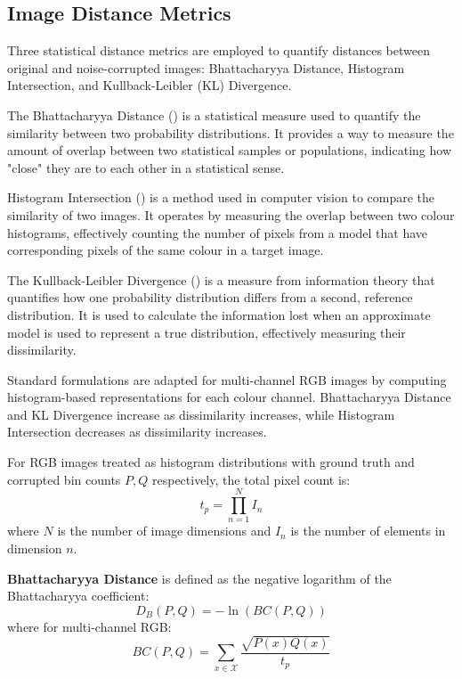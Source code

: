 
\subsection{Image Distance Metrics}
\label{methods:distance_metrics}

Three statistical distance metrics are employed to quantify distances between original and noise-corrupted images: Bhattacharyya Distance, Histogram Intersection, and Kullback-Leibler (KL) Divergence. 

The Bhattacharyya Distance (\cite{bhattacharyya1943}) is a statistical measure used to quantify the similarity between two probability distributions. It provides a way to measure the amount of overlap between two statistical samples or populations, indicating how "close" they are to each other in a statistical sense.

Histogram Intersection (\cite{swain1991}) is a method used in computer vision to compare the similarity of two images. It operates by measuring the overlap between two colour histograms, effectively counting the number of pixels from a model that have corresponding pixels of the same colour in a target image. 

The Kullback-Leibler Divergence (\cite{kullback1951}) is a measure from information theory that quantifies how one probability distribution differs from a second, reference distribution. It is used to calculate the information lost when an approximate model is used to represent a true distribution, effectively measuring their dissimilarity. 

Standard formulations are adapted for multi-channel RGB images by computing histogram-based representations for each colour channel. Bhattacharyya Distance and KL Divergence increase as dissimilarity increases, while Histogram Intersection decreases as dissimilarity increases.

For RGB images treated as histogram distributions with ground truth and corrupted bin counts $P,Q$ respectively, the total pixel count is:
\begin{equation}
\label{eq:t_p}
  t_p = \prod\limits_{n=1}^{N}I_n   
\end{equation}
where $N$ is the number of image dimensions and $I_n$ is the number of elements in dimension $n$.

\textbf{Bhattacharyya Distance} is defined as the negative logarithm of the Bhattacharyya coefficient:
\begin{equation}
    D_{B}(P,Q) = -\ln(BC(P,Q))
\end{equation}
where for multi-channel RGB:
\begin{equation}
BC(P,Q) = \sum\limits_{x\in \mathcal{X}} \frac{\sqrt{P(x)Q(x)}}{t_p}
\end{equation}

